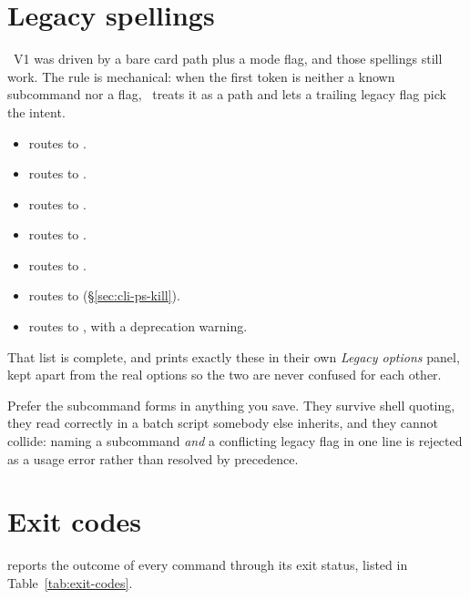 \section{Legacy spellings}
\label{sec:cli-legacy}

\Jarvis\ V1 was driven by a bare card path plus a mode flag, and those spellings still
work. The rule is mechanical: when the first token is neither a known subcommand nor a
flag, \Jtwo\ treats it as a path and lets a trailing legacy flag pick the intent.

\begin{itemize}
  \item {} routes to .
  \item {} routes to .
  \item {} routes to .
  \item {} routes to .
  \item {} routes to .
  \item {} routes to  (\S\ref{sec:cli-ps-kill}).
  \item {} routes to , with a deprecation
        warning.
\end{itemize}

That list is complete, and  prints exactly these in their own
\emph{Legacy options} panel, kept apart from the real options so the two are never
confused for each other.

Prefer the subcommand forms in anything you save. They survive shell quoting, they read
correctly in a batch script somebody else inherits, and they cannot collide: naming a
subcommand \emph{and} a conflicting legacy flag in one line is rejected as a usage error
rather than resolved by precedence.

\section{Exit codes}
\label{sec:exit-codes}

 reports the outcome of every command through its exit status, listed in
Table~\ref{tab:exit-codes}.

